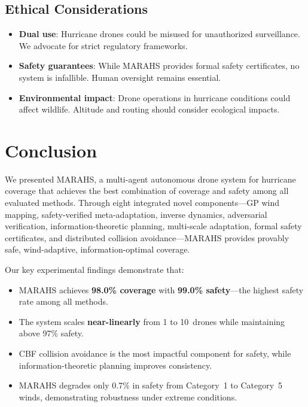 \documentclass[11pt,twocolumn]{article}
\theoremstyle{definition}
\begin{document}
\subsection{Ethical Considerations}

\begin{itemize}[leftmargin=*]
    \item \textbf{Dual use}: Hurricane drones could be misused for unauthorized surveillance. We advocate for strict regulatory frameworks.
    \item \textbf{Safety guarantees}: While MARAHS provides formal safety certificates, no system is infallible. Human oversight remains essential.
    \item \textbf{Environmental impact}: Drone operations in hurricane conditions could affect wildlife. Altitude and routing should consider ecological impacts.
\end{itemize}

\section{Conclusion}
\label{sec:conclusion}

We presented MARAHS, a multi-agent autonomous drone system for hurricane coverage that achieves the best combination of coverage and safety among all evaluated methods. Through eight integrated novel components---GP wind mapping, safety-verified meta-adaptation, inverse dynamics, adversarial verification, information-theoretic planning, multi-scale adaptation, formal safety certificates, and distributed collision avoidance---MARAHS provides provably safe, wind-adaptive, information-optimal coverage.

Our key experimental findings demonstrate that:
\begin{itemize}[leftmargin=*]
    \item MARAHS achieves \textbf{98.0\% coverage} with \textbf{99.0\% safety}---the highest safety rate among all methods.
    \item The system scales \textbf{near-linearly} from 1 to 10~drones while maintaining above 97\% safety.
    \item CBF collision avoidance is the most impactful component for safety, while information-theoretic planning improves consistency.
    \item MARAHS degrades only 0.7\% in safety from Category~1 to Category~5 winds, demonstrating robustness under extreme conditions.
\end{itemize}
\end{document}
